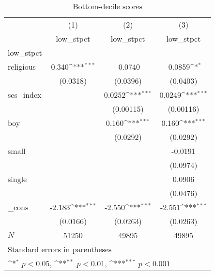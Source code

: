 \begin{table}[htbp]\centering
\def\sym#1{\ifmmode^{#1}\else\(^{#1}\)\fi}
\caption{Bottom-decile scores}
\begin{tabular}{l*{3}{c}}
\hline\hline
            &\multicolumn{1}{c}{(1)}&\multicolumn{1}{c}{(2)}&\multicolumn{1}{c}{(3)}\\
            &\multicolumn{1}{c}{low\_stpct}&\multicolumn{1}{c}{low\_stpct}&\multicolumn{1}{c}{low\_stpct}\\
\hline
low\_stpct   &                     &                     &                     \\
religious   &       0.340\sym{***}&     -0.0740         &     -0.0859\sym{*}  \\
            &    (0.0318)         &    (0.0396)         &    (0.0403)         \\
[1em]
ses\_index   &                     &      0.0252\sym{***}&      0.0249\sym{***}\\
            &                     &   (0.00115)         &   (0.00116)         \\
[1em]
boy         &                     &       0.160\sym{***}&       0.160\sym{***}\\
            &                     &    (0.0292)         &    (0.0292)         \\
[1em]
small       &                     &                     &     -0.0191         \\
            &                     &                     &    (0.0974)         \\
[1em]
single      &                     &                     &      0.0906         \\
            &                     &                     &    (0.0476)         \\
[1em]
\_cons      &      -2.183\sym{***}&      -2.550\sym{***}&      -2.551\sym{***}\\
            &    (0.0166)         &    (0.0263)         &    (0.0263)         \\
\hline
\(N\)       &       51250         &       49895         &       49895         \\
\hline\hline
\multicolumn{4}{l}{\footnotesize Standard errors in parentheses}\\
\multicolumn{4}{l}{\footnotesize \sym{*} \(p<0.05\), \sym{**} \(p<0.01\), \sym{***} \(p<0.001\)}\\
\end{tabular}
\end{table}
